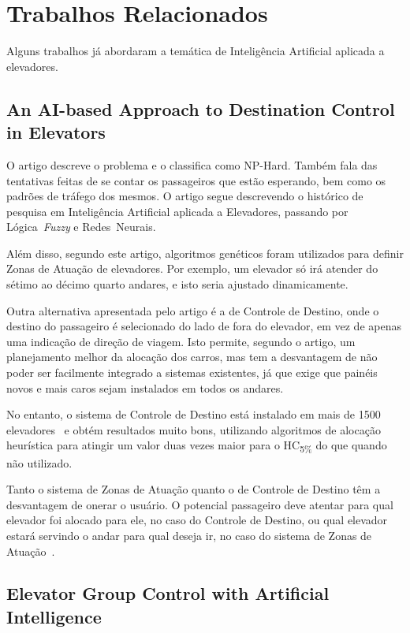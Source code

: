 \chapter{\label{chap:related}Trabalhos Relacionados}

Alguns trabalhos já abordaram a temática de Inteligência Artificial aplicada a
elevadores. %

\section{\label{section:koehler}An AI-based Approach to Destination Control in
Elevators~\cite{KOEHLEROTTIGER02}}

O artigo descreve o problema e o classifica como NP-Hard. Também fala das
tentativas feitas de se contar os passageiros que estão esperando, bem como os
padrões de tráfego dos mesmos. O artigo segue descrevendo o histórico de
pesquisa em Inteligência Artificial aplicada a Elevadores, passando por
Lógica~\textit{Fuzzy} e Redes~Neurais.

Além disso, segundo este artigo, algoritmos genéticos foram utilizados para
definir Zonas de Atuação de elevadores. Por exemplo, um elevador só irá atender
do sétimo ao décimo quarto andares, e isto seria ajustado dinamicamente.

Outra alternativa apresentada pelo artigo é a de Controle de Destino, onde o
destino do passageiro é selecionado do lado de fora do elevador, em vez de
apenas uma indicação de direção de viagem. Isto permite, segundo o artigo, um
planejamento melhor da alocação dos carros, mas tem a desvantagem de não poder
ser facilmente integrado a sistemas existentes, já que exige que painéis novos e
mais caros sejam instalados em todos os andares.

No entanto, o sistema de Controle de Destino está instalado em mais de 1500
elevadores~\cite{KOEHLEROTTIGER02} e obtém resultados muito bons, utilizando
algoritmos de alocação heurística para atingir um valor duas vezes maior para o
HC\textsubscript{5\%} do que quando não utilizado.

Tanto o sistema de Zonas de Atuação quanto o de Controle de Destino têm a
desvantagem de onerar o usuário. O potencial passageiro deve atentar para qual
elevador foi alocado para ele, no caso do Controle de Destino, ou qual elevador
estará servindo o andar para qual deseja ir, no caso do sistema de Zonas de
Atuação~\cite{KOEHLEROTTIGER02}.

\section{\label{section:marja}Elevator Group Control with Artificial Intelligence~\cite{marja97}}

